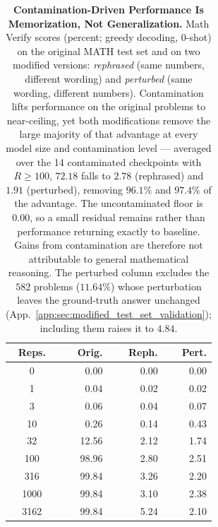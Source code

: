 \begin{table}[t!]
\begin{minipage}[t]{0.32\textwidth}
        \centering
        \setlength{\tabcolsep}{3.5pt}
        \begin{tabular}{crrr}
            \toprule
            \textbf{Reps.} & \textbf{Orig.} & \textbf{Reph.} & \textbf{Pert.} \\
            \midrule
            0    & 0.00 & 0.00 & 0.00 \\
            1    & 0.04 & 0.02 & 0.02 \\
            3    & 0.06 & 0.04 & 0.07 \\
            10   & 0.26 & 0.14 & 0.43 \\
            32   & 12.56 & 2.12 & 1.74 \\
            100  & 98.96 & 2.80 & 2.51 \\
            316  & 99.84 & 3.26 & 2.20 \\
            1000 & 99.84 & 3.10 & 2.38 \\
            3162 & 99.84 & 5.24 & 2.10 \\
            \bottomrule
        \end{tabular}
    \end{minipage}
    \caption{\textbf{Contamination-Driven Performance Is Memorization, Not Generalization.} Math Verify scores (percent; greedy decoding, 0-shot) on the original MATH test set and on two modified versions: \emph{rephrased} (same numbers, different wording) and \emph{perturbed} (same wording, different numbers). Contamination lifts performance on the original problems to near-ceiling, yet both modifications remove the large majority of that advantage at every model size and contamination level --- averaged over the 14 contaminated checkpoints with $R \geq 100$, $72.18$ falls to $2.78$ (rephrased) and $1.91$ (perturbed), removing $96.1\%$ and $97.4\%$ of the advantage. The uncontaminated floor is $0.00$, so a small residual remains rather than performance returning exactly to baseline. Gains from contamination are therefore not attributable to general mathematical reasoning. The perturbed column excludes the $582$ problems ($11.64\%$) whose perturbation leaves the ground-truth answer unchanged (App.~\ref{app:sec:modified_test_set_validation}); including them raises it to $4.84$.}
    \label{tab:rephrase_perturb}
\end{table}

